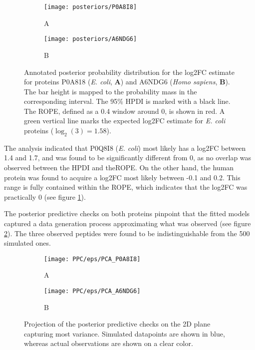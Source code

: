 \begin{figure}[!h]
\centering
\begin{subfigure}{0.8\textwidth}
\caption*{A}
\texttt{[image: posteriors/P0A8I8]}
\end{subfigure}
\bigskip
\begin{subfigure}{0.8\textwidth}
\caption*{B}
\texttt{[image: posteriors/A6NDG6]}
\end{subfigure}
\caption[Posteriors for 2 proteins]{Annotated posterior probability distribution for the \ac{log2FC} estimate for proteins P0A818 (\textit{E. coli}, \textbf{A}) and A6NDG6 (\textit{Homo sapiens}, \textbf{B}). The bar height is mapped to the probability mass in the corresponding interval. The 95\% \ac{HPDI} is marked with a black line. The \ac{ROPE}, defined as a 0.4 window around 0, is shown in red. A green vertical line marks the expected \ac{log2FC} estimate for \textit{E. coli} proteins ($\log_2(3)=1.58$).}
\label{fig:posteriors}
\end{figure}

The analysis indicated that P0Q8I8 (\textit{E. coli}) most likely has a \ac{log2FC} between 1.4 and 1.7, and was found to be significantly different from 0, as no overlap was observed between the \ac{HPDI} and the\ac{ROPE}. On the other hand, the human protein was found to acquire a \ac{log2FC} most likely between -0.1 and 0.2. This range is fully contained within the \ac{ROPE}, which indicates that the \ac{log2FC} was practically 0 (see figure \ref{fig:posteriors}).


The posterior predictive checks on both proteins pinpoint that the fitted models captured a data generation process approximating what was observed (see figure \ref{fig:ppc}). The three observed peptides were found to be indistinguishable from the 500 simulated ones.

\begin{figure}[!h]
\centering
\begin{subfigure}{0.8\textwidth}
\caption*{A}
\texttt{[image: PPC/eps/PCA\_P0A8I8]}
\end{subfigure}
\bigskip
\begin{subfigure}{0.8\textwidth}
\caption*{B}
\texttt{[image: PPC/eps/PCA\_A6NDG6]}
\end{subfigure}
\caption[Posterior predictive checks]{Projection of the posterior predictive checks on the 2D plane capturing most variance. Simulated datapoints are shown in blue, whereas actual observations are shown on a clear color.}
\label{fig:ppc}
\end{figure}


